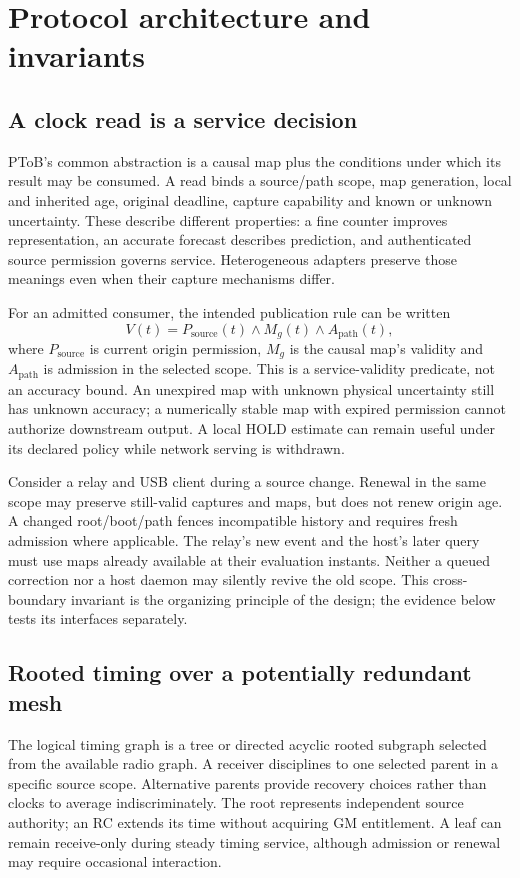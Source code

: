 \documentclass[11pt,letterpaper]{article}
\begin{document}
\section{Protocol architecture and invariants}
\subsection{A clock read is a service decision}
PToB's common abstraction is a causal map plus the conditions under which its result may be consumed. A read binds a source/path scope, map generation, local and inherited age, original deadline, capture capability and known or unknown uncertainty. These describe different properties: a fine counter improves representation, an accurate forecast describes prediction, and authenticated source permission governs service. Heterogeneous adapters preserve those meanings even when their capture mechanisms differ.

For an admitted consumer, the intended publication rule can be written
\begin{equation}
 V(t)=P_{\mathrm{source}}(t)\land M_g(t)\land A_{\mathrm{path}}(t),
\end{equation}
where $P_{\mathrm{source}}$ is current origin permission, $M_g$ is the causal map's validity and $A_{\mathrm{path}}$ is admission in the selected scope. This is a service-validity predicate, not an accuracy bound. An unexpired map with unknown physical uncertainty still has unknown accuracy; a numerically stable map with expired permission cannot authorize downstream output. A local HOLD estimate can remain useful under its declared policy while network serving is withdrawn.

Consider a relay and USB client during a source change. Renewal in the same scope may preserve still-valid captures and maps, but does not renew origin age. A changed root/boot/path fences incompatible history and requires fresh admission where applicable. The relay's new event and the host's later query must use maps already available at their evaluation instants. Neither a queued correction nor a host daemon may silently revive the old scope. This cross-boundary invariant is the organizing principle of the design; the evidence below tests its interfaces separately.

\subsection{Rooted timing over a potentially redundant mesh}
The logical timing graph is a tree or directed acyclic rooted subgraph selected from the available radio graph. A receiver disciplines to one selected parent in a specific source scope. Alternative parents provide recovery choices rather than clocks to average indiscriminately. The root represents independent source authority; an RC extends its time without acquiring GM entitlement. A leaf can remain receive-only during steady timing service, although admission or renewal may require occasional interaction.
\end{document}
